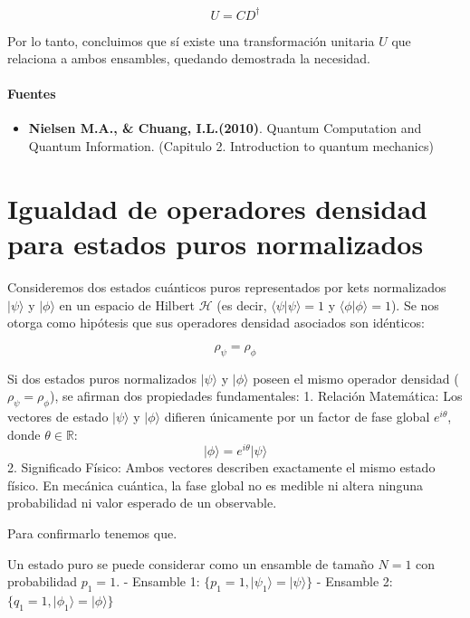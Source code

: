 \documentclass[11pt]{article}
\providecommand{\tightlist}{%
      \setlength{\itemsep}{0pt}\setlength{\parskip}{0pt}}
\begin{document}
\[U = C D^\dagger\]

Por lo tanto, concluimos que sí existe una transformación unitaria \(U\)
que relaciona a ambos ensambles, quedando demostrada la necesidad.

    \paragraph{Fuentes}\label{fuentes}

\begin{itemize}
\tightlist
\item
  \textbf{Nielsen M.A., \& Chuang, I.L.(2010)}. Quantum Computation and
  Quantum Information. (Capitulo 2. Introduction to quantum mechanics)
\end{itemize}

    \section{Igualdad de operadores densidad para estados puros
normalizados}\label{igualdad-de-operadores-densidad-para-estados-puros-normalizados}

Consideremos dos estados cuánticos puros representados por kets
normalizados \(\vert{}\psi\rangle\) y \(\vert{}\phi\rangle\) en un
espacio de Hilbert \(\mathcal{H}\) (es decir,
\(\langle\psi\vert{}\psi\rangle = 1\) y
\(\langle\phi\vert{}\phi\rangle = 1\)). Se nos otorga como hipótesis que
sus operadores densidad asociados son idénticos:

\[\rho_\psi = \rho_\phi\]

Si dos estados puros normalizados \(\vert{}\psi\rangle\) y
\(\vert{}\phi\rangle\) poseen el mismo operador densidad
(\(\rho_\psi = \rho_\phi\)), se afirman dos propiedades fundamentales:
1. Relación Matemática: Los vectores de estado \(\vert{}\psi\rangle\) y
\(\vert{}\phi\rangle\) difieren únicamente por un factor de fase global
\(e^{i\theta}\), donde \(\theta \in \mathbb{R}\):
\[\vert{}\phi\rangle = e^{i\theta} \vert{}\psi\rangle\] 2. Significado
Físico: Ambos vectores describen exactamente el mismo estado físico. En
mecánica cuántica, la fase global no es medible ni altera ninguna
probabilidad ni valor esperado de un observable.

Para confirmarlo tenemos que.

Un estado puro se puede considerar como un ensamble de tamaño \(N = 1\)
con probabilidad \(p_1 = 1\). - Ensamble 1:
\(\{p_1 = 1, \vert{}\psi_1\rangle = \vert{}\psi\rangle\}\) - Ensamble 2:
\(\{q_1 = 1, \vert{}\phi_1\rangle = \vert{}\phi\rangle\}\)
\end{document}
